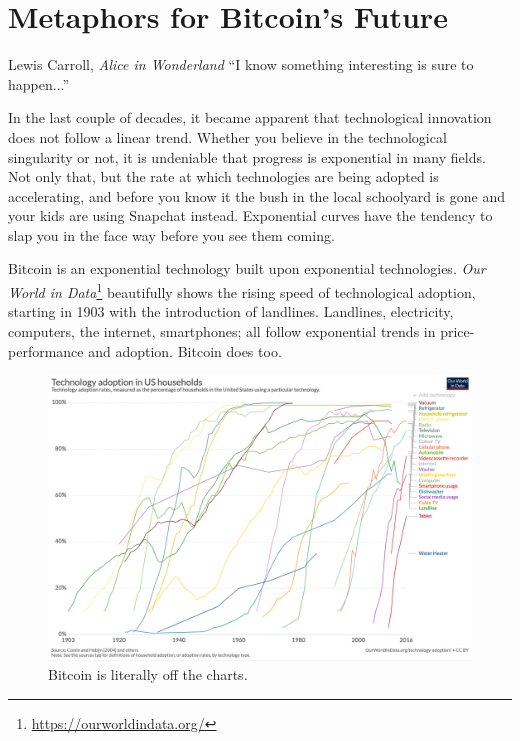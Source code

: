 \chapter{Metaphors for Bitcoin's Future}
\label{les:21}

\begin{chapquote}{Lewis Carroll, \textit{Alice in Wonderland}}
``I know something interesting is sure to happen...''
\end{chapquote}

In the last couple of decades, it became apparent that technological
innovation does not follow a linear trend. Whether you believe in the
technological singularity or not, it is undeniable that progress is
exponential in many fields. Not only that, but the rate at which
technologies are being adopted is accelerating, and before you know it
the bush in the local schoolyard is gone and your kids are using
Snapchat instead. Exponential curves have the tendency to slap you in
the face way before you see them coming.

Bitcoin is an exponential technology built upon exponential technologies.
\textit{Our World in Data}\footnote{\url{https://ourworldindata.org/}}
beautifully shows the rising speed of technological adoption, starting in 1903
with the introduction of landlines. Landlines, electricity, computers, the
internet, smartphones; all follow exponential trends in price-performance and
adoption. Bitcoin does too. \cite{tech-adoption}

\begin{figure}
  \includegraphics{assets/images/tech-adoption.png}
  \caption{Bitcoin is literally off the charts.}
  \label{fig:tech-adoption}
\end{figure}

